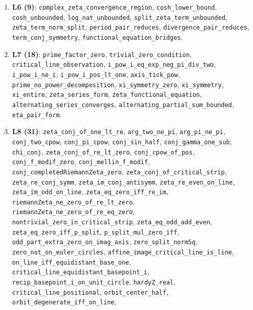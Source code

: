 \documentclass{article}
\begin{document}
{\begin{sloppypar}
\begin{enumerate}
\texttt{leak\_sign\_is\_unit\_square}, \texttt{unit\_1\_on\_real\_circle},
\texttt{unit\_j\_on\_imag\_circle}, \texttt{real\_circle\_is\_direction\_1},
\texttt{imag\_circle\_is\_direction\_j}, \texttt{directions\_orthogonal},
\texttt{euler\_plane}.
\item \textbf{L6 (9)}: \texttt{complex\_zeta\_convergence\_region},
\texttt{cosh\_lower\_bound}, \texttt{cosh\_unbounded},
\texttt{log\_nat\_unbounded}, \texttt{split\_zeta\_term\_unbounded},
\texttt{zeta\_term\_norm\_split}, \texttt{period\_pair\_reduces},
\texttt{divergence\_pair\_reduces}, \texttt{term\_conj\_symmetry},
\texttt{functional\_equation\_bridges}.
\item \textbf{L7 (18)}: \texttt{prime\_factor\_zero},
\texttt{trivial\_zero\_condition}, \texttt{critical\_line\_observation},
\texttt{i\_pow\_i\_eq\_exp\_neg\_pi\_div\_two}, \texttt{i\_pow\_i\_ne\_i},
\texttt{i\_pow\_i\_pos\_lt\_one}, \texttt{axis\_tick\_pow},
\texttt{prime\_no\_power\_decomposition}, \texttt{xi\_symmetry\_zero},
\texttt{xi\_symmetry}, \texttt{xi\_entire}, \texttt{zeta\_series\_form},
\texttt{zeta\_functional\_equation}, \texttt{alternating\_series\_converges},
\texttt{alternating\_partial\_sum\_bounded}, \texttt{eta\_pair\_form}.
\item \textbf{L8 (31)}: \texttt{zeta\_conj\_of\_one\_lt\_re},
\texttt{arg\_two\_ne\_pi}, \texttt{arg\_pi\_ne\_pi}, \texttt{conj\_two\_cpow},
\texttt{conj\_pi\_cpow}, \texttt{conj\_sin\_half}, \texttt{conj\_gamma\_one\_sub},
\texttt{chi\_conj}, \texttt{zeta\_conj\_of\_re\_lt\_zero},
\texttt{conj\_cpow\_of\_pos}, \texttt{conj\_f\_modif\_zero},
\texttt{conj\_mellin\_f\_modif}, \texttt{conj\_completedRiemannZeta\_zero},
\texttt{zeta\_conj\_of\_critical\_strip}, \texttt{zeta\_re\_conj\_symm},
\texttt{zeta\_im\_conj\_antisymm}, \texttt{zeta\_re\_even\_on\_line},
\texttt{zeta\_im\_odd\_on\_line}, \texttt{zeta\_eq\_zero\_iff\_re\_im},
\texttt{riemannZeta\_ne\_zero\_of\_re\_lt\_zero},
\texttt{riemannZeta\_ne\_zero\_of\_re\_eq\_zero},
\texttt{nontrivial\_zero\_in\_critical\_strip}, \texttt{zeta\_eq\_odd\_add\_even},
\texttt{zeta\_eq\_zero\_iff\_p\_split}, \texttt{p\_split\_mul\_zero\_iff},
\texttt{odd\_part\_extra\_zero\_on\_imag\_axis}, \texttt{zero\_split\_normSq},
\texttt{zero\_not\_on\_euler\_circles},
\texttt{affine\_image\_critical\_line\_is\_line},
\texttt{on\_line\_iff\_equidistant\_base\_one},
\texttt{critical\_line\_equidistant\_basepoint\_i},
\texttt{recip\_basepoint\_i\_on\_unit\_circle}, \texttt{hardyZ\_real},
\texttt{critical\_line\_positional}, \texttt{orbit\_center\_half},
\texttt{orbit\_degenerate\_iff\_on\_line},

\end{enumerate}
\end{sloppypar}}
\end{document}
